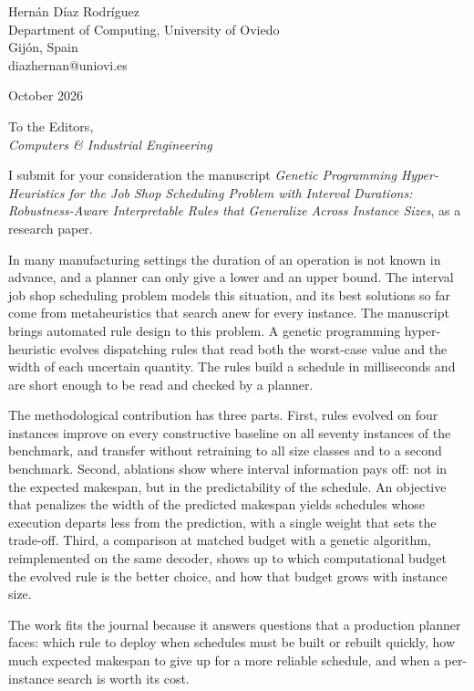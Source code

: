 \documentclass[11pt]{article}
\begin{document}
\noindent
Hern\'an D\'iaz Rodr\'iguez\\
Department of Computing, University of Oviedo\\
Gij\'on, Spain\\
diazhernan@uniovi.es

\vspace{1em}
 October 2026

\vspace{1em}
\noindent To the Editors,\\
\emph{Computers \& Industrial Engineering}

\vspace{1em}

I submit for your consideration the manuscript \emph{Genetic
Programming Hyper-Heuristics for the Job Shop Scheduling Problem with
Interval Durations: Robustness-Aware Interpretable Rules that Generalize
Across Instance Sizes}, as a research paper.

In many manufacturing settings the duration of an operation is not
known in advance, and a planner can only give a lower and an upper
bound. The interval job shop scheduling problem models this situation,
and its best solutions so far come from metaheuristics that search anew
for every instance. The manuscript brings automated rule design to this
problem. A genetic programming hyper-heuristic evolves dispatching rules
that read both the worst-case value and the width of each uncertain
quantity. The rules build a schedule in milliseconds and are short
enough to be read and checked by a planner.

The methodological contribution has three parts. First, rules evolved
on four instances improve on every constructive baseline on all seventy
instances of the benchmark, and transfer without retraining to all size
classes and to a second benchmark. Second, ablations show where interval
information pays off: not in the expected makespan, but in the
predictability of the schedule. An objective that penalizes the width of
the predicted makespan yields schedules whose execution departs less
from the prediction, with a single weight that sets the trade-off.
Third, a comparison at matched budget with a genetic algorithm,
reimplemented on the same decoder, shows up to which computational
budget the evolved rule is the better choice, and how that budget grows
with instance size.

The work fits the journal because it answers questions that a
production planner faces: which rule to deploy when schedules must be
built or rebuilt quickly, how much expected makespan to give up for a
more reliable schedule, and when a per-instance search is worth its
cost.
\end{document}
